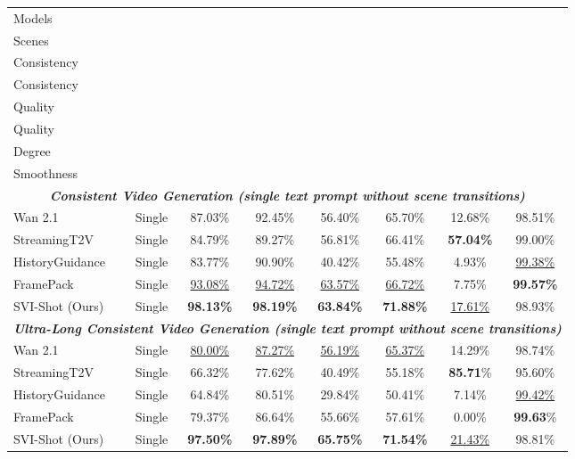 \documentclass{article} %
\newcommand{\highlight}[1]{\textbf{\emph{#1}}}
\newcommand{\best}[1]{{\textbf{#1}}}
\newcommand{\secondbest}[1]{{\underline{#1}}}
\begin{document}
\begin{table}[t]
\centering
\setlength\tabcolsep{4pt}
\footnotesize 
\begin{tabular}{l|c|c|c|c|c|c|c}
\hline
Models
& {\Centerstack{Generated \\Scenes }}
& {\Centerstack{Subject \\Consistency}} 
& {\Centerstack{Background \\Consistency}} 
& {\Centerstack{Aesthetic\\Quality}} 
& {\Centerstack{Imaging\\Quality}} 
& {\Centerstack{Dynamic\\Degree}} 
& {\Centerstack{Motion\\Smoothness}} \\ 
\hline
\multicolumn{8}{c}{{\highlight{Consistent Video Generation (single text prompt without scene transitions)}}} \\
\hline
Wan 2.1 & Single & 87.03\% & 92.45\% & 56.40\% & 65.70\% & 12.68\% & 98.51\% \\ 
StreamingT2V & Single & 84.79\% & 89.27\% & 56.81\% & 66.41\% & \best{57.04\%} & 99.00\% \\
HistoryGuidance & Single & 83.77\% & 90.90\% & 40.42\% & 55.48\% & 4.93\% & \secondbest{99.38\%} \\ 
FramePack & Single & \secondbest{93.08\%} & \secondbest{94.72\%} & \secondbest{63.57\%} & \secondbest{66.72\%} & 7.75\% & \best{99.57\%} \\ 
\rowcolor{blue!10} SVI-Shot (Ours) &Single& \best{98.13\%}& \best{98.19\%} & \best{63.84\%} & \best{71.88\%} & \secondbest{17.61\%} & 98.93\% \\ 
\hline
\multicolumn{8}{c}{{\highlight{Ultra-Long Consistent Video Generation (single text prompt without scene transitions)}}} \\
\hline
Wan 2.1 & Single & \secondbest{80.00\%} & \secondbest{87.27\%} & \secondbest{56.19\%} & \secondbest{65.37\%} & 14.29\% & 98.74\% \\ 
StreamingT2V & Single & 66.32\% & 77.62\% & 40.49\% & 55.18\% & \best{85.71}\% & 95.60\% \\ 
HistoryGuidance &Single & 64.84\% & 80.51\% & 29.84\% & 50.41\% & 7.14\% & \secondbest{99.42\%} \\ 
FramePack &Single & 79.37\% & 86.64\% & 55.66\% & 57.61\% & 0.00\% & \best{99.63}\% \\ 
\rowcolor{blue!10} SVI-Shot (Ours)&Single& \best{97.50\%} & \best{97.89\%} & \best{65.75\%} & \best{71.54\%} & \secondbest{21.43\%} & 98.81\% \\ 

\end{tabular}
\end{table}
\end{document}
